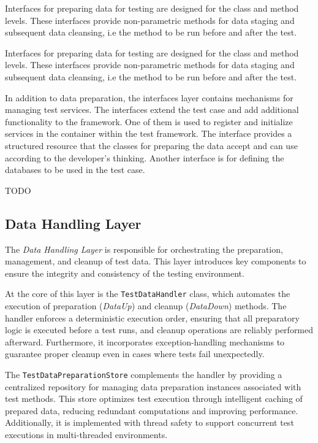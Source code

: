 Interfaces for preparing data for testing are designed for the class and method levels. These interfaces provide non-parametric methods for data staging and subsequent data cleansing, i.e the method to be run before and after the test.

Interfaces for preparing data for testing are designed for the class and method levels. These interfaces provide non-parametric methods for data staging and subsequent data cleansing, i.e the method to be run before and after the test.

In addition to data preparation, the interfaces layer contains mechanisms for managing test services. The interfaces extend the test case and add additional functionality to the framework.   One of them is used to register and initialize services in the container within the test framework. 
The interface provides a structured resource that the classes for preparing the data accept and can use according to the developer's thinking.
Another interface is for defining the databases to be used in the test case. 

TODO


\subsection{Data Handling Layer}
The \textit{Data Handling Layer} is responsible for orchestrating the preparation, management, and cleanup of test data. This layer introduces key components to ensure the integrity and consistency of the testing environment.

At the core of this layer is the \texttt{TestDataHandler} class, which automates the execution of preparation (\textit{DataUp}) and cleanup (\textit{DataDown}) methods. The handler enforces a deterministic execution order, ensuring that all preparatory logic is executed before a test runs, and cleanup operations are reliably performed afterward. Furthermore, it incorporates exception-handling mechanisms to guarantee proper cleanup even in cases where tests fail unexpectedly.

The \texttt{TestDataPreparationStore} complements the handler by providing a centralized repository for managing data preparation instances associated with test methods. This store optimizes test execution through intelligent caching of prepared data, reducing redundant computations and improving performance. Additionally, it is implemented with thread safety to support concurrent test executions in multi-threaded environments.

